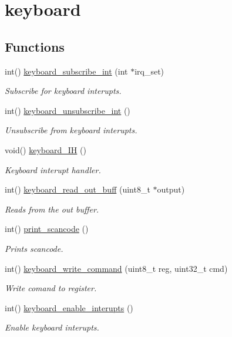 \hypertarget{group__keyboard}{}\section{keyboard}
\label{group__keyboard}
\subsection*{Functions}
\begin{DoxyCompactItemize}
\item 
int() \hyperlink{group__keyboard_gaefd0e3aafc75eb71df4d778f356b6dd7}{keyboard\+\_\+subscribe\+\_\+int} (int $\ast$irq\+\_\+set)
\begin{DoxyCompactList}\small\item\em Subscribe for keyboard interupts. \end{DoxyCompactList}\item 
int() \hyperlink{group__keyboard_ga32cc4de66854f8a7bd909e7aa8b901ed}{keyboard\+\_\+unsubscribe\+\_\+int} ()
\begin{DoxyCompactList}\small\item\em Unsubscribe from keyboard interupts. \end{DoxyCompactList}\item 
void() \hyperlink{group__keyboard_gabb14446976ac2fcfaf095866f58d28ce}{keyboard\+\_\+\+IH} ()
\begin{DoxyCompactList}\small\item\em Keyboard interupt handler. \end{DoxyCompactList}\item 
int() \hyperlink{group__keyboard_ga01f4a2303581946d7d26fdb5ac7c0caf}{keyboard\+\_\+read\+\_\+out\+\_\+buff} (uint8\+\_\+t $\ast$output)
\begin{DoxyCompactList}\small\item\em Reads from the out buffer. \end{DoxyCompactList}\item 
int() \hyperlink{group__keyboard_ga50ccd1d4a10b2f8d6f380d3581eae423}{print\+\_\+scancode} ()
\begin{DoxyCompactList}\small\item\em Prints scancode. \end{DoxyCompactList}\item 
int() \hyperlink{group__keyboard_gad6f191b6116f8df3e057322f0c76b66a}{keyboard\+\_\+write\+\_\+command} (uint8\+\_\+t reg, uint32\+\_\+t cmd)
\begin{DoxyCompactList}\small\item\em Write comand to register. \end{DoxyCompactList}\item 
int() \hyperlink{group__keyboard_ga0f2b9c07b7d16125c5fb2e05d9427e76}{keyboard\+\_\+enable\+\_\+interupts} ()
\begin{DoxyCompactList}\small\item\em Enable keyboard interupts. \end{DoxyCompactList}\end{DoxyCompactItemize}
